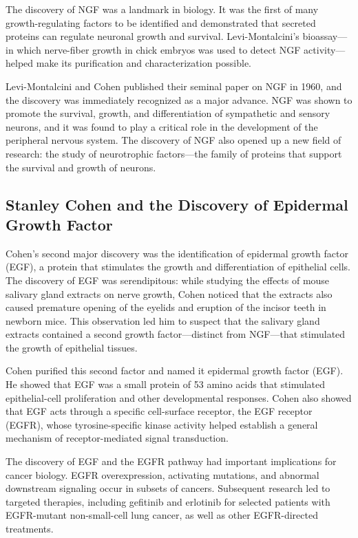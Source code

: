 The discovery of NGF was a landmark in biology. It was the first of many growth-regulating factors to be identified and demonstrated that secreted proteins can regulate neuronal growth and survival. Levi-Montalcini's bioassay---in which nerve-fiber growth in chick embryos was used to detect NGF activity---helped make its purification and characterization possible.

Levi-Montalcini and Cohen published their seminal paper on NGF in 1960, and the discovery was immediately recognized as a major advance. NGF was shown to promote the survival, growth, and differentiation of sympathetic and sensory neurons, and it was found to play a critical role in the development of the peripheral nervous system. The discovery of NGF also opened up a new field of research: the study of neurotrophic factors---the family of proteins that support the survival and growth of neurons.

\subsection{Stanley Cohen and the Discovery of Epidermal Growth Factor}

Cohen's second major discovery was the identification of epidermal growth factor (EGF), a protein that stimulates the growth and differentiation of epithelial cells. The discovery of EGF was serendipitous: while studying the effects of mouse salivary gland extracts on nerve growth, Cohen noticed that the extracts also caused premature opening of the eyelids and eruption of the incisor teeth in newborn mice. This observation led him to suspect that the salivary gland extracts contained a second growth factor---distinct from NGF---that stimulated the growth of epithelial tissues.

Cohen purified this second factor and named it epidermal growth factor (EGF). He showed that EGF was a small protein of 53 amino acids that stimulated epithelial-cell proliferation and other developmental responses. Cohen also showed that EGF acts through a specific cell-surface receptor, the EGF receptor (EGFR), whose tyrosine-specific kinase activity helped establish a general mechanism of receptor-mediated signal transduction.

The discovery of EGF and the EGFR pathway had important implications for cancer biology. EGFR overexpression, activating mutations, and abnormal downstream signaling occur in subsets of cancers. Subsequent research led to targeted therapies, including gefitinib and erlotinib for selected patients with EGFR-mutant non-small-cell lung cancer, as well as other EGFR-directed treatments.

